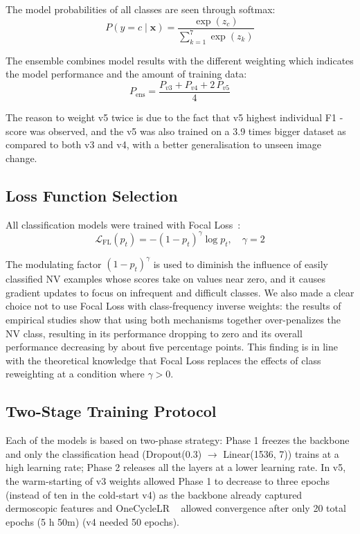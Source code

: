 \documentclass[conference]{IEEEtran}
\begin{document}
The model probabilities of all classes are seen through softmax:
\begin{equation}
P(y = c \mid \mathbf{x}) = \frac{\exp(z_c)}{\sum_{k=1}^{7} \exp(z_k)}
\end{equation}

The ensemble combines model results with the different weighting which indicates the model performance and the amount of training data:
\begin{equation}
P_{\text{ens}} = \frac{P_{v3} + P_{v4} + 2\,P_{v5}}{4}
\label{eq:ensemble}
\end{equation}

The reason to weight v5 twice is due to the fact that v5 highest individual F1 -score was observed, and the v5 was also trained on a 3.9 times bigger dataset as compared to both v3 and v4, with a better generalisation to unseen image change.

\subsection{Loss Function Selection}

All classification models were trained with Focal Loss~\cite{lin2017focal}:
\begin{equation}
\mathcal{L}_{\text{FL}}(p_t) = -(1 - p_t)^{\gamma}\log p_t, \quad \gamma = 2
\end{equation}

The modulating factor $(1-p_t)^\gamma$ is used to diminish the influence of easily classified NV examples whose scores take on values near zero, and it causes gradient updates to focus on infrequent and difficult classes. We also made a clear choice not to use Focal Loss with class-frequency inverse weights: the results of empirical studies show that using both mechanisms together over-penalizes the NV class, resulting in its performance dropping to zero and its overall performance decreasing by about five percentage points. This finding is in line with the theoretical knowledge that Focal Loss replaces the effects of class reweighting at a condition where $\gamma > 0$.

\subsection{Two-Stage Training Protocol}

Each of the models is based on two-phase strategy: Phase 1 freezes the backbone and only the classification head (Dropout(0.3) $\rightarrow$ Linear(1536, 7)) trains at a high learning rate; Phase 2 releases all the layers at a lower learning rate. In v5, the warm-starting of v3 weights allowed Phase 1 to decrease to three epochs (instead of ten in the cold-start v4) as the backbone already captured dermoscopic features and OneCycleLR ~\cite{smith2019superconvergence} allowed convergence after only 20 total epochs (5 h 50m) (v4 needed 50 epochs).
\end{document}
